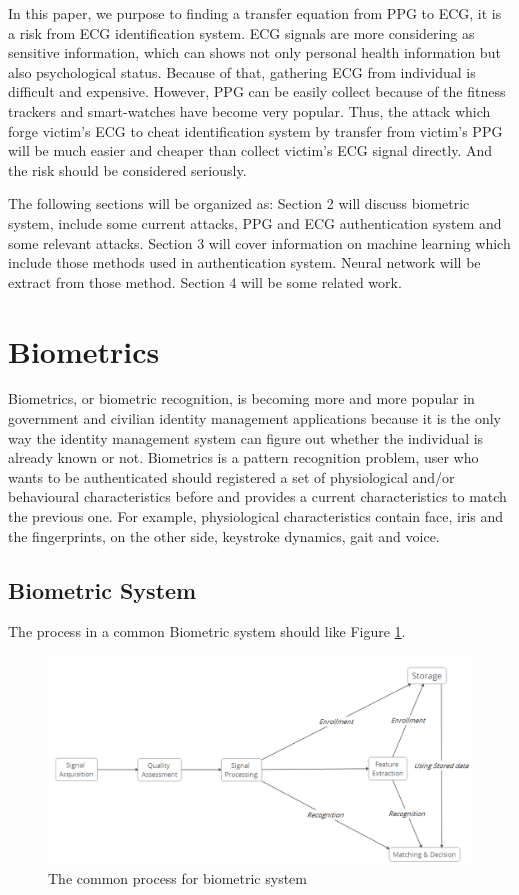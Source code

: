 \documentclass[a4paper,12pt]{article}
\begin{document}
In this paper, we purpose to finding a transfer equation from PPG to ECG, it is a risk from ECG identification system. ECG signals are more considering as sensitive information, which can shows not only personal health information but also psychological status\parencite{Damousis:2008unobtrusive}. Because of that, gathering ECG from individual is difficult and expensive. However, PPG can be easily collect because of the fitness trackers and smart-watches have become very popular\parencite{Blasco:2018feasibility}. Thus, the attack which forge victim's ECG to cheat identification system by transfer from victim's PPG will be much easier and cheaper than collect victim's ECG signal directly. And the risk should be considered seriously. 

The following sections will be organized as: Section 2 will discuss biometric system, include some current attacks, PPG and ECG authentication system and some relevant attacks. Section 3 will cover information on machine learning which include those methods used in authentication system. Neural network will be extract from those method. Section 4 will be some related work.

\section{Biometrics}\label{Biometrics}
Biometrics, or biometric recognition, is becoming more and more popular in government and civilian identity management applications because it is the only way the identity management system can figure out whether the individual is already known or not\parencite{Jain:2011bio}. Biometrics is a pattern recognition problem, user who wants to be authenticated should registered a set of physiological and/or behavioural characteristics before and provides a current characteristics to match the previous one\parencite{Blasco:2018feasibility}. For example, physiological characteristics contain face, iris and the fingerprints, on the other side, keystroke dynamics, gait and voice\parencite{Agrafioti:2011heart}. 

\subsection{Biometric System}
The process in a common Biometric system should like Figure \ref{fig:common_process}.

\begin{figure}[h!]
\centering
\includegraphics[width = .8\textwidth]{common_bio_process.png}
\caption{The common process for biometric system}
\label{fig:common_process}
\end{figure}
\end{document}
